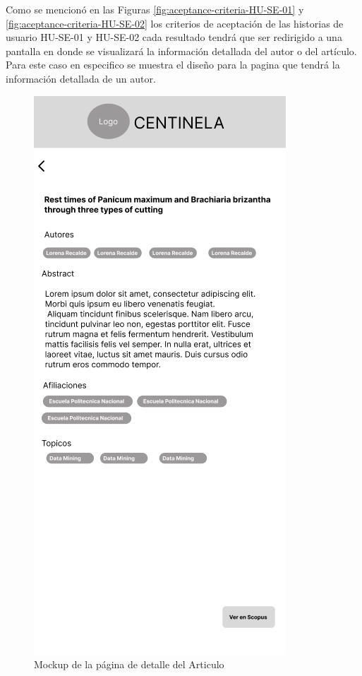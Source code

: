 Como se mencionó en las Figuras \ref{fig:aceptance-criteria-HU-SE-01} y \ref{fig:aceptance-criteria-HU-SE-02} los criterios de aceptación de las historias de usuario HU-SE-01 y HU-SE-02 cada resultado tendrá que ser redirigido a una pantalla en donde 
se visualizará la información detallada del autor o del artículo. Para este caso en especifico se muestra el diseño para la pagina que tendrá
la información detallada de un autor.
\begin{figure}[H]
    \centering
    \includegraphics[scale=0.8]{../02Figures/02Chapter/Sprints/Sprint-1/article-detail.png}
    \caption{Mockup de la página de detalle del Articulo}
    \label{fig:mockup-article-detail}
\end{figure}

